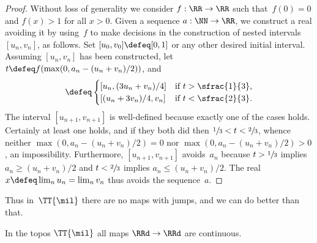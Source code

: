 \begin{proof}
  Without loss of generality we consider $f : \RR \to \RR$ such that~$f(0) = 0$ and $f(x) > 1$ for all $x > 0$.
  Given a sequence $a : \NN \to \RR$, we construct a real avoiding it by using~$f$ to make decisions in the
  construction of nested intervals $[u_n, v_n]$, as follows. Set $[u_0, v_0] \defeq [0, 1]$ or any other desired initial interval. Assuming $[u_n, v_n]$ has been constructed, let $t \defeq f(\max(0, a_n - (u_n + v_n)/2))$, and
  \begin{equation*}
    [u_{n+1}, v_{n+1}] \defeq
    \begin{cases}
      [u_n, (3 u_n + v_n)/4] &\text{if $t > \sfrac{1}{3}$,} \\
      [(u_n + 3 v_n)/4, v_n] &\text{if $t < \sfrac{2}{3}$.}
    \end{cases}
  \end{equation*}
  The interval $[u_{n+1}, v_{n+1}]$ is well-defined because exactly one of the cases holds.
  Certainly at least one holds, and if they both did then $\sfrac{1}{3} < t < \sfrac{2}{3}$, whence neither $\max(0, a_n - (u_n + v_n)/2) = 0$ nor $\max(0, a_n - (u_n + v_n)/2) > 0$, an impossibility.
  Furthermore, $[u_{n+1}, v_{n+1}]$ avoids~$a_n$ because $t > \sfrac{1}{3}$ implies $a_n \geq (u_n + v_n)/2$ and $t < \sfrac{2}{3}$ implies $a_n \leq (u_n + v_n)/2$.
  The real $x \defeq \lim_n u_n = \lim_n v_n$ thus avoids the sequence~$a$.
\end{proof}

Thus in~$\TT{\mil}$ there are no maps with jumps, and we can do better than that.

\begin{theorem}[KLST]
  In the topos $\TT{\mil}$ all maps $\RRd \to \RRd$ are continuous.
\end{theorem}

